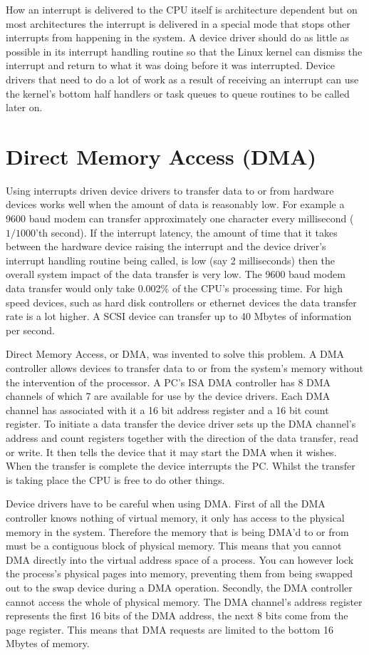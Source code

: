 How an interrupt is delivered to the CPU itself is architecture dependent but on most architectures the 
interrupt is delivered in a special mode that stops other interrupts from happening in the
system.
A device driver should do as little as possible in its interrupt handling routine so that
the Linux kernel can dismiss the interrupt and return to what it was doing before it
was interrupted.
Device drivers that need to do a lot of work as a result of receiving an interrupt
can use the kernel's bottom half handlers or task queues to queue routines to be called later on.

\section{Direct Memory Access (DMA)}
Using interrupts driven device drivers to transfer data to or from hardware devices works well when the
amount of data is reasonably low.
For example a 9600 baud modem can transfer approximately one character every millisecond (\(1/1000 \)'th second).
If the interrupt latency, the amount of time that it takes between the hardware device raising the
interrupt and the device driver's interrupt handling routine being called, is low (say 2 milliseconds)
then the overall system impact of the data transfer is very low.
The 9600 baud modem data transfer would only take 0.002\% of the CPU's processing time.
For high speed devices, such as hard disk controllers or ethernet devices the data transfer rate is a lot
higher.
A SCSI device can transfer up to 40 Mbytes of information per second.

Direct Memory Access, or DMA, was invented to solve this problem.
A DMA controller allows devices to transfer data to or from the system's memory without the intervention of the
processor.
A PC's ISA DMA controller has 8 DMA channels of which 7 are available for use by the device drivers.
Each DMA channel has associated with it a 16 bit address register and a 16 bit count register.
To initiate a data transfer the device driver sets up the DMA channel's address and count registers together
with the direction of the data transfer, read or write.
It then tells the device that it may start the DMA when it wishes.
When the transfer is complete the device interrupts the PC.
Whilst the transfer is taking place the CPU is free to do other things.

Device drivers have to be careful when using DMA.
First of all the DMA controller knows nothing of virtual memory, it only has access to the physical memory
in the system.
Therefore the memory that is being DMA'd to or from must be a contiguous block of physical memory.
This means that you cannot DMA directly into the virtual address space of a process.
You can however lock the process's physical pages into memory, preventing them from being swapped out
to the swap device during a DMA operation.
Secondly, the DMA controller cannot access the whole of physical memory.
The DMA channel's address register represents the first 16 bits of the DMA address, the next 8 bits come
from the page register.
This means that DMA requests are limited to the bottom 16 Mbytes of memory.

